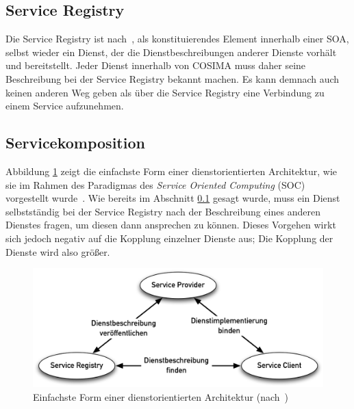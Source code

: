 
\subsection{Service Registry} %
\label{sub:service_registry}

  Die Service Registry ist nach~\citep{service_oriented_computing}, als konstituierendes Element innerhalb einer SOA, selbst wieder ein Dienst, der die Dienstbeschreibungen anderer Dienste vorhält und bereitstellt. Jeder Dienst innerhalb von COSIMA muss daher seine Beschreibung bei der Service Registry bekannt machen. Es kann demnach auch keinen anderen Weg geben als über die Service Registry eine Verbindung zu einem Service aufzunehmen.



\subsection{Servicekomposition} %
\label{sub:service_komposition}

  Abbildung \ref{fig:images_Basic_SOA} zeigt die einfachste Form einer dienstorientierten Architektur, wie sie im Rahmen des Paradigmas des \emph{Service Oriented Computing} (SOC) vorgestellt wurde~\citep{service_oriented_computing}. Wie bereits im Abschnitt \ref{sub:service_registry} gesagt wurde, muss ein Dienst selbstständig bei der Service Registry nach der Beschreibung eines anderen Dienstes fragen, um diesen dann ansprechen zu können. Dieses Vorgehen wirkt sich jedoch negativ auf die Kopplung einzelner Dienste aus; Die Kopplung der Dienste wird also größer.
  
\begin{figure}[hb]
  \centering
    \includegraphics[width=.9\textwidth]{images/Basic_SOA.png}
  \caption{Einfachste Form einer dienstorientierten Architektur (nach~\citep{service_oriented_computing})}
  \label{fig:images_Basic_SOA}
\end{figure}

